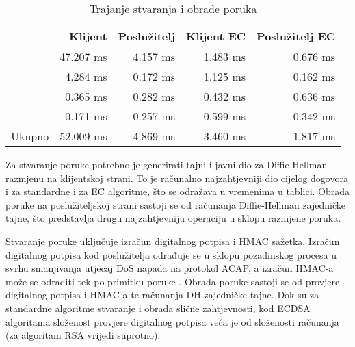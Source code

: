 \begin{table}[htb]
\caption{Trajanje stvaranja i obrade poruka}
\renewcommand{\arraystretch}{1.3}
\label{tab:obrada}
\centering
\normalsize
\begin{tabular}{ l  r  r  r  r }
\toprule &
    Klijent &
    Poslužitelj &
    Klijent EC &
    Poslužitelj EC
    \\ \midrule
\initi{} &
    \colorbox{yellow!50}{47.207 ms} &
    \colorbox{white!50}{4.157 ms} &
    \colorbox{yellow!50}{1.483 ms} &
    \colorbox{white!50}{0.676 ms}
    \\ \hline
\initr{} &
    \colorbox{white!50}{4.284 ms} &
    \colorbox{yellow!50}{0.172 ms} &
    \colorbox{white!50}{1.125 ms} &
    \colorbox{yellow!50}{0.162 ms}
    \\ \hline
\listi{} &
    \colorbox{yellow!50}{0.365 ms} &
    \colorbox{white!50}{0.282 ms} &
    \colorbox{yellow!50}{0.432 ms} &
    \colorbox{white!50}{0.636 ms}
    \\ \hline
\listr{} &
    \colorbox{white!50}{0.171 ms} &
    \colorbox{yellow!50}{0.257 ms} & 
    \colorbox{white!50}{0.599 ms} &
    \colorbox{yellow!50}{0.342 ms}
    \\ \hline
Ukupno &
    52.009 ms &
    4.869 ms &
    3.460 ms &
    1.817 ms
    \\ \bottomrule
\end{tabular}
\end{table}

Za stvaranje poruke \initi{} potrebno je generirati tajni i javni dio za
Diffie-Hellman razmjenu na klijentskoj strani. To je računalno najzahtjevniji
dio cijelog dogovora i za standardne i za EC algoritme, što se odražava u
vremenima u tablici. Obrada poruke \initi{}
na poslužiteljskoj strani sastoji se od računanja Diffie-Hellman zajedničke
tajne, što predstavlja drugu najzahtjevniju operaciju u sklopu razmjene poruka.

Stvaranje poruke \initr{} uključuje izračun digitalnog potpisa i HMAC sažetka.
Izračun digitalnog potpisa kod poslužitelja odrađuje se u sklopu pozadinskog
procesa u svrhu smanjivanja utjecaj DoS napada na protokol ACAP, a izračun
HMAC-a može se odraditi tek po primitku poruke \initi{}. Obrada poruke
\initr{} sastoji se od provjere digitalnog potpisa i HMAC-a te računanja DH
zajedničke tajne. Dok su za standardne algoritme stvaranje i obrada \initr{}
slične zahtjevnosti, kod ECDSA algoritama složenost provjere digitalnog potpisa
veća je od složenosti računanja (za algoritam RSA vrijedi suprotno).

